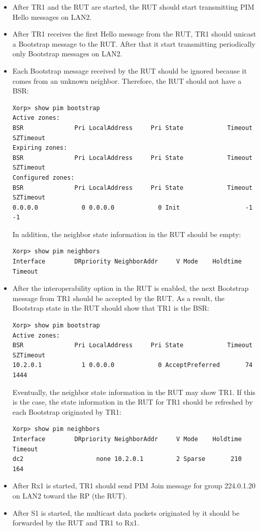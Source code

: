 \documentclass[11pt]{report}
\begin{document}
\begin{itemize}

  \item After TR1 and the RUT are started, the RUT should start transmitting
  PIM Hello messages on LAN2.

  \item After TR1 receives the first Hello message from the RUT, TR1 should
  unicast a Bootstrap message to the RUT. After that it start transmitting
  periodically only Bootstrap messages on LAN2.

  \item Each Bootstrap message received by the RUT should be ignored because
  it comes from an unknown neighbor. Therefore, the RUT should not have a
  BSR:

\begin{verbatim}
Xorp> show pim bootstrap
Active zones:
BSR              Pri LocalAddress     Pri State            Timeout SZTimeout
Expiring zones:
BSR              Pri LocalAddress     Pri State            Timeout SZTimeout
Configured zones:
BSR              Pri LocalAddress     Pri State            Timeout SZTimeout
0.0.0.0            0 0.0.0.0            0 Init                  -1        -1
\end{verbatim}

  In addition, the neighbor state information in the RUT should be empty:

\begin{verbatim}
Xorp> show pim neighbors 
Interface        DRpriority NeighborAddr     V Mode    Holdtime Timeout
\end{verbatim}


  \item After the interoperability option in the RUT is enabled, the next
  Bootstrap message from TR1 should be accepted by the RUT. As a result, the
  Bootstrap state in the RUT should show that TR1 is the BSR:

\begin{verbatim}
Xorp> show pim bootstrap
Active zones:
BSR              Pri LocalAddress     Pri State            Timeout SZTimeout
10.2.0.1           1 0.0.0.0            0 AcceptPreferred       74      1444
\end{verbatim}

  Eventually, the neighbor state information in the RUT may show TR1. If this
  is the case, the state information in the RUT for TR1 should be refreshed by
  each Bootstrap originated by TR1:

\begin{verbatim}
Xorp> show pim neighbors 
Interface        DRpriority NeighborAddr     V Mode    Holdtime Timeout
dc2                    none 10.2.0.1         2 Sparse       210     164
\end{verbatim}

  \item After Rx1 is started, TR1 should send PIM Join message for group
  224.0.1.20 on LAN2 toward the RP (the RUT).

  \item After S1 is started, the multicast data packets originated by it
  should be forwarded by the RUT and TR1 to Rx1.

\end{itemize}
\end{document}
